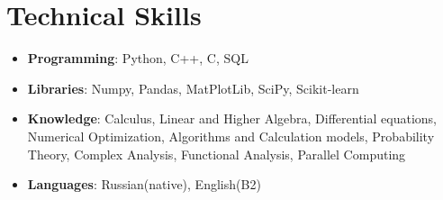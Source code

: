 \documentclass[letterpaper,10pt]{article}
\newcommand{\resumeSubHeadingListStart}{\begin{itemize}[leftmargin=*]}
\newcommand{\resumeSubHeadingListEnd}{\end{itemize}}
\begin{document}
\section{Technical Skills}
 \resumeSubHeadingListStart
   \item{
     \textbf{Programming}{: Python, C++, C, SQL }
   }\vspace{-7pt}
   \item{
     \textbf{Libraries}{: Numpy, Pandas, MatPlotLib, SciPy, Scikit-learn}
   }
   \vspace{-7pt}
   \item{
     \textbf{Knowledge}{: Calculus, Linear and Higher Algebra, Differential equations, Numerical Optimization, Algorithms and Calculation models, Probability Theory, Complex Analysis, Functional Analysis, Parallel Computing}
   }\vspace{-7pt}
   \item{
   \textbf{Languages}{: Russian(native), English(B2) }
   }
 \resumeSubHeadingListEnd


\end{document}
